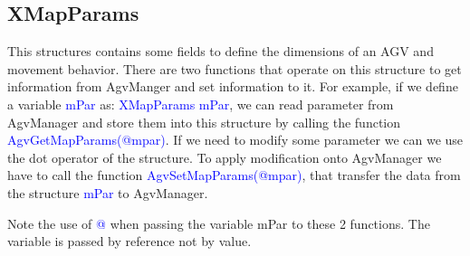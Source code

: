 %
\subsection{XMapParams}
This structures contains some fields to define the dimensions of an AGV and movement behavior. There are two functions that operate on this structure to get information from AgvManger and set information to it.
For example, if we define a variable \textcolor{blue}{mPar} as: \textcolor{blue}{XMapParams mPar}, we can read parameter from AgvManager and store them into this structure by calling the function \textcolor{blue}{AgvGetMapParams(@mpar)}.
If we need to modify some parameter we can we use the dot operator of the structure.
To apply modification onto AgvManager we have to call the function \textcolor{blue}{AgvSetMapParams(@mpar)}, that transfer the data from the structure \textcolor{blue}{mPar} to AgvManager.

Note the use of \textcolor{blue}{@} when passing the variable mPar to these 2 functions. The variable is passed by reference not by value.

